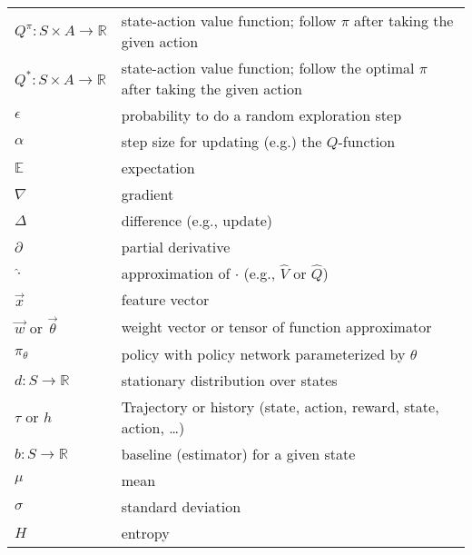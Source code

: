 \documentclass[]{article}
\begin{document}
\begin{table}[h]
\begin{tabular}{ll}
		$Q^\pi: S \times A \to \mathbb{R}$ & state-action value function; follow $\pi$ after taking the given action\\
		$Q^*: S \times A \to \mathbb{R}$ & state-action value function; follow the optimal $\pi$ after taking the given action\\
		$\epsilon$ & probability to do a random exploration step\\
		$\alpha$ & step size for updating (e.g.) the $Q$-function\\
		$\mathbb{E}$ & expectation\\
		$\nabla$ & gradient\\
		$\Delta$ & difference (e.g., update)\\
		$\partial$ & partial derivative\\
		$\hat{\cdot}$ & approximation of $\cdot$ (e.g., $\hat{V}$ or $\hat{Q}$)\\
		$\vec{x}$ & feature vector\\
		$\vec{w}$ or $\vec{\theta}$ & weight vector or tensor of function approximator\\
		$\pi_\theta$ & policy with policy network parameterized by $\theta$\\
		$d: S \to \mathbb{R}$ & stationary distribution over states\\
		$\tau$ or $h$ & Trajectory or history (state, action, reward, state, action, \ldots)\\
		$b: S \to \mathbb{R}$ & baseline (estimator) for a given state\\
		$\mu$ & mean\\
		$\sigma$ & standard deviation\\
    	$H$ & entropy\\
		\bottomrule
\end{tabular}
\end{table}
\end{document}
